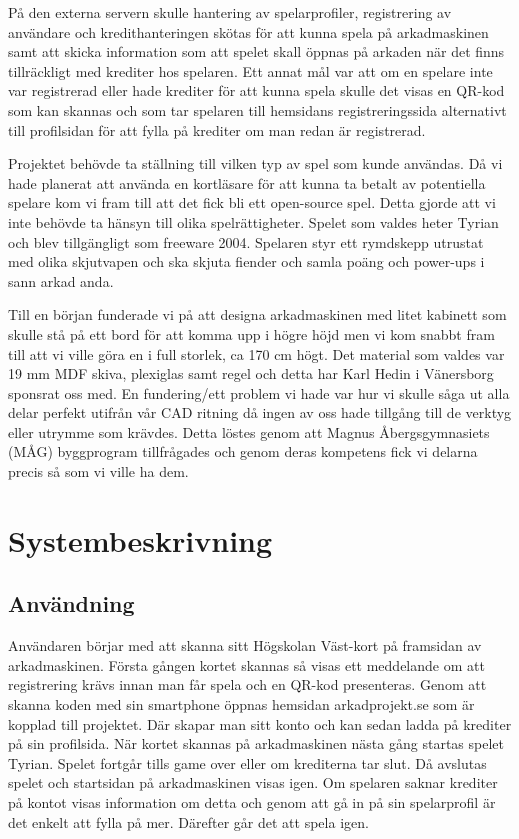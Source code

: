 \documentclass[12pt,fleqn,openany]{book} %
\begin{document}
På den externa servern skulle hantering av spelarprofiler, registrering av användare och kredithanteringen skötas för att kunna spela på arkadmaskinen
samt att skicka information som att spelet skall öppnas på arkaden när det finns tillräckligt med krediter hos spelaren. Ett annat mål 
var att om en spelare inte var registrerad eller hade krediter för att kunna spela skulle det visas en QR-kod som kan skannas och som 
tar spelaren till hemsidans registreringssida alternativt till profilsidan för att fylla på krediter om man redan är registrerad. 

Projektet behövde ta ställning till vilken typ av spel som kunde användas. Då vi hade planerat att använda en kortläsare för att kunna 
ta betalt av potentiella spelare kom vi fram till att det fick bli ett open-source spel. Detta gjorde att vi inte behövde ta hänsyn till
olika spelrättigheter. Spelet som valdes heter Tyrian och blev tillgängligt som freeware 2004. Spelaren styr ett rymdskepp utrustat med 
olika skjutvapen och ska skjuta fiender och samla poäng och power-ups i sann arkad anda.

Till en början funderade vi på att designa arkadmaskinen med litet kabinett som skulle stå på ett bord för att komma upp i högre höjd
men vi kom snabbt fram till att vi ville göra en i full storlek, ca 170 cm högt. Det material som valdes var 19 mm MDF skiva, plexiglas
samt regel och detta har Karl Hedin i Vänersborg sponsrat oss med. En fundering/ett problem vi hade var hur vi skulle såga ut alla delar
perfekt utifrån vår CAD ritning då ingen av oss hade tillgång till de verktyg eller utrymme som krävdes. Detta löstes genom att Magnus
Åbergsgymnasiets (MÅG) byggprogram tillfrågades och genom deras kompetens fick vi delarna precis så som vi ville ha dem.

\section{Systembeskrivning}
\subsection{Användning}
Användaren börjar med att skanna sitt Högskolan Väst-kort på framsidan av arkadmaskinen. Första gången kortet skannas så visas ett 
meddelande om att registrering krävs innan man får spela och en QR-kod presenteras. Genom att skanna koden med sin smartphone öppnas 
hemsidan arkadprojekt.se som är kopplad till projektet. Där skapar man sitt konto och kan sedan ladda på krediter på sin profilsida. 
När kortet skannas på arkadmaskinen nästa gång startas spelet Tyrian. Spelet fortgår tills game over eller om krediterna tar slut. 
Då avslutas spelet och startsidan på arkadmaskinen visas igen. Om spelaren saknar krediter på kontot visas information om detta och 
genom att gå in på sin spelarprofil är det enkelt att fylla på mer. Därefter går det att spela igen.
\end{document}
